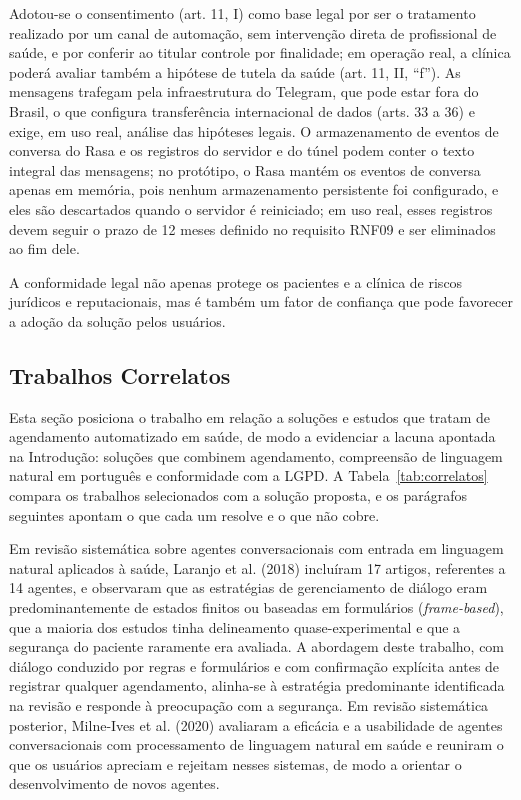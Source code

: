 \documentclass[12pt,a4paper]{extarticle}
\begin{document}
Adotou-se o consentimento (art. 11, I) como base legal por ser o tratamento realizado por um canal de automação, sem intervenção direta de profissional de saúde, e por conferir ao titular controle por finalidade; em operação real, a clínica poderá avaliar também a hipótese de tutela da saúde (art. 11, II, ``f''). As mensagens trafegam pela infraestrutura do Telegram, que pode estar fora do Brasil, o que configura transferência internacional de dados (arts. 33 a 36) e exige, em uso real, análise das hipóteses legais. O armazenamento de eventos de conversa do Rasa e os registros do servidor e do túnel podem conter o texto integral das mensagens; no protótipo, o Rasa mantém os eventos de conversa apenas em memória, pois nenhum armazenamento persistente foi configurado, e eles são descartados quando o servidor é reiniciado; em uso real, esses registros devem seguir o prazo de 12 meses definido no requisito RNF09 e ser eliminados ao fim dele.

 A conformidade legal não apenas protege os pacientes e a clínica de riscos jurídicos e reputacionais, mas é também um fator de confiança que pode favorecer a adoção da solução pelos usuários.

 \subsection{Trabalhos Correlatos}
\label{sec:correlatos}

Esta seção posiciona o trabalho em relação a soluções e estudos que tratam de agendamento automatizado em saúde, de modo a evidenciar a lacuna apontada na Introdução: soluções que combinem agendamento, compreensão de linguagem natural em português e conformidade com a LGPD. A Tabela~\ref{tab:correlatos} compara os trabalhos selecionados com a solução proposta, e os parágrafos seguintes apontam o que cada um resolve e o que não cobre.

Em revisão sistemática sobre agentes conversacionais com entrada em linguagem natural aplicados à saúde, Laranjo et al. (2018) incluíram 17 artigos, referentes a 14 agentes, e observaram que as estratégias de gerenciamento de diálogo eram predominantemente de estados finitos ou baseadas em formulários (\textit{frame-based}), que a maioria dos estudos tinha delineamento quase-experimental e que a segurança do paciente raramente era avaliada. A abordagem deste trabalho, com diálogo conduzido por regras e formulários e com confirmação explícita antes de registrar qualquer agendamento, alinha-se à estratégia predominante identificada na revisão e responde à preocupação com a segurança. Em revisão sistemática posterior, Milne-Ives et al. (2020) avaliaram a eficácia e a usabilidade de agentes conversacionais com processamento de linguagem natural em saúde e reuniram o que os usuários apreciam e rejeitam nesses sistemas, de modo a orientar o desenvolvimento de novos agentes.
\end{document}
